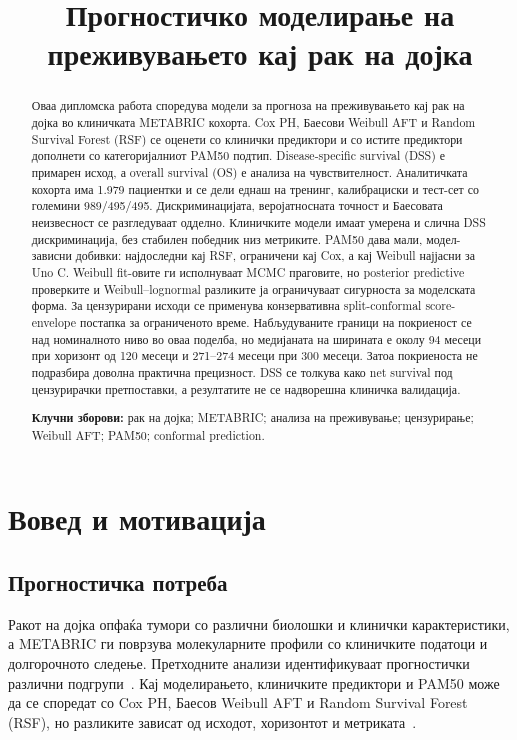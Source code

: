 \documentclass[12pt]{article}
\title{Прогностичко моделирање на преживувањето кај рак на дојка}
\date{}
\begin{document}
\maketitle

\begin{abstract}
Оваа дипломска работа споредува модели за прогноза на преживувањето кај рак на
дојка во клиничката METABRIC кохорта. Cox PH, Баесови Weibull AFT и Random
Survival Forest (RSF) се оценети со клинички предиктори и со истите предиктори
дополнети со категоријалниот PAM50 подтип. Disease-specific survival (DSS) е
примарен исход, а overall survival (OS) е анализа на чувствителност. Аналитичката
кохорта има 1.979 пациентки и се дели еднаш на тренинг, калибрациски и тест-сет
со големини 989/495/495. Дискриминацијата, веројатносната точност и Баесовата
неизвесност се разгледуваат одделно. Клиничките модели имаат умерена и слична
DSS дискриминација, без стабилен победник низ метриките. PAM50 дава мали,
модел-зависни добивки: најдоследни кај RSF, ограничени кај Cox, а кај Weibull
најјасни за Uno C. Weibull fit-овите ги исполнуваат MCMC праговите, но posterior
predictive проверките и Weibull--lognormal разликите ја ограничуваат сигурноста
за моделската форма. За цензурирани исходи се применува конзервативна
split-conformal score-envelope постапка за ограниченото време. Набљудуваните
граници на покриеност се над номиналното ниво во оваа поделба, но медијаната на
ширината е околу 94 месеци при хоризонт од 120 месеци и 271--274 месеци при 300
месеци. Затоа покриеноста не подразбира доволна практична прецизност. DSS се
толкува како net survival под цензурирачки претпоставки, а резултатите не се
надворешна клиничка валидација.

\medskip
\noindent\textbf{Клучни зборови:} рак на дојка; METABRIC; анализа на
преживување; цензурирање; Weibull AFT; PAM50; conformal prediction.
\end{abstract}

\clearpage
\setcounter{tocdepth}{2}
\tableofcontents
\clearpage

\section{Вовед и мотивација}

\subsection{Прогностичка потреба}

Ракот на дојка опфаќа тумори со различни биолошки и клинички карактеристики, а METABRIC ги поврзува молекуларните профили со клиничките податоци и долгорочното следење. Претходните анализи идентификуваат прогностички различни подгрупи~\cite{curtis2012}. Кај моделирањето, клиничките предиктори и PAM50 може да се споредат со Cox PH, Баесов Weibull AFT и Random Survival Forest (RSF), но разликите зависат од исходот, хоризонтот и метриката~\cite{neapolitan2015,wissel2025}.
\end{document}
